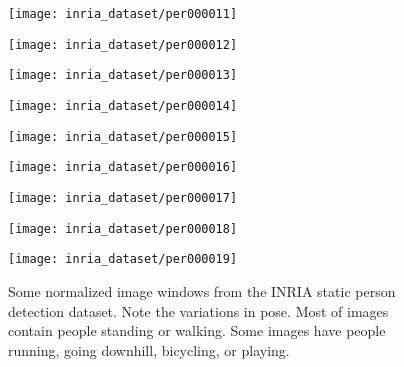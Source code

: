 \begin{figure*}[!t]
    \begin{minipage}{2.0\columnwidth}
      \begin{minipage}{0.1\columnwidth} \centerline{\texttt{[image: inria\_dataset/per000011]}}  \end{minipage} \hfill 
      \begin{minipage}{0.1\columnwidth} \centerline{\texttt{[image: inria\_dataset/per000012]}}  \end{minipage} \hfill 
      \begin{minipage}{0.1\columnwidth} \centerline{\texttt{[image: inria\_dataset/per000013]}}  \end{minipage} \hfill 
      \begin{minipage}{0.1\columnwidth} \centerline{\texttt{[image: inria\_dataset/per000014]}}  \end{minipage} \hfill 
      \begin{minipage}{0.1\columnwidth} \centerline{\texttt{[image: inria\_dataset/per000015]}}  \end{minipage} \hfill 
      \begin{minipage}{0.1\columnwidth} \centerline{\texttt{[image: inria\_dataset/per000016]}}  \end{minipage} \hfill 
      \begin{minipage}{0.1\columnwidth} \centerline{\texttt{[image: inria\_dataset/per000017]}}  \end{minipage} \hfill 
      \begin{minipage}{0.1\columnwidth} \centerline{\texttt{[image: inria\_dataset/per000018]}}  \end{minipage} \hfill 
      \begin{minipage}{0.1\columnwidth} \centerline{\texttt{[image: inria\_dataset/per000019]}}  \end{minipage} \hfill
    \end{minipage}
    
  \vspace{-1ex}
  \caption
    {
    \small
	Some normalized image windows from the INRIA static person detection
	dataset. Note the variations in pose. Most of images contain people standing or
	walking. Some images have people running, going downhill, bicycling, or playing.
    }
  \label{fig:inria_dataset_example}
\end{figure*}


